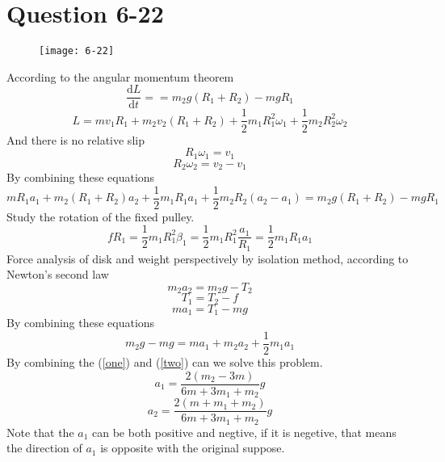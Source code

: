 \documentclass[12pt,a4paper]{article}%
\begin{document}
	\section{Question 6-22}
	\begin{figure}[H]
		\centering
		\texttt{[image: 6-22]}
		\caption*{}
		\label{fig:6-22}
	\end{figure}
	\noindent According to the angular momentum theorem
	\begin{equation}
		\frac{\mathrm{d}L}{\mathrm{d}t}= =m_2g\left( R_1+R_2 \right) -mgR_1
	\end{equation}
	\begin{equation}
		L= mv_1R_1+m_2v_2\left( R_1+R_2 \right) +\frac{1}{2}m_1R_{1}^{2}\omega _1+\frac{1}{2}m_2R_{2}^{2}\omega _2 
	\end{equation}
	And there is no relative slip
	\begin{equation}
		R_1\omega_1=v_1
	\end{equation}
	\begin{equation}
		R_2\omega_2=v_2-v_1
	\end{equation}
	By combining these equations
	\begin{equation}
		mR_1a_1+m_2\left( R_1+R_2 \right) a_2+\frac{1}{2}m_1R_1a_1+\frac{1}{2}m_2R_2\left( a_2-a_1 \right) =m_2g\left( R_1+R_2 \right) -mgR_1
		\label{one}
	\end{equation}
	Study the rotation of the fixed pulley.
	\begin{equation}
		fR_1=\frac{1}{2}m_1R_1^2\beta_1=\frac{1}{2}m_1R_1^2\frac{a_1}{R_1}=\frac{1}{2}m_1R_1a_1
	\end{equation}
	Force analysis of disk and weight perspectively by isolation method, according to Newton's second law
	\begin{equation}
		m_2a_2=m_2g-T_2
	\end{equation}
	\begin{equation}
		T_1=T_2-f
	\end{equation}
	\begin{equation}
		ma_1=T_1-mg
	\end{equation}
	By combining these equations
	\begin{equation}
		m_2g-mg=ma_1+m_2a_2+\frac{1}{2}m_1a_1
		\label{two}
	\end{equation}
	By combining the (\ref{one}) and (\ref{two}) can we solve this problem.
	$$
	a_1=\frac{2(m_2-3m)}{6m+3m_1+m_2}g
	$$
	$$
	a_2=\frac{2(m+m_1+m_2)}{6m+3m_1+m_2}g
	$$
	Note that the $a_1$ can be both positive and negtive, if it is negetive, that means the direction of $a_1$ is opposite with the original suppose.
\end{document}
